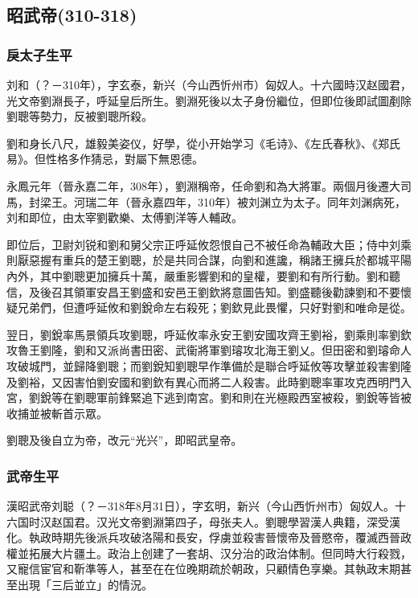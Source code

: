 
\subsection{昭武帝\tiny(310-318)}

\subsubsection{戾太子生平}

刘和（？－310年），字玄泰，新兴（今山西忻州市）匈奴人。十六國時汉赵國君，光文帝劉淵長子，呼延皇后所生。劉淵死後以太子身份繼位，但即位後即試圖剷除劉聰等勢力，反被劉聰所殺。

劉和身长八尺，雄毅美姿仪，好學，從小开始学习《毛诗》、《左氏春秋》、《郑氏易》。但性格多作猜忌，對屬下無恩德。

永鳳元年（晉永嘉二年，308年），劉淵稱帝，任命劉和為大將軍。兩個月後遷大司馬，封梁王。河瑞二年（晉永嘉四年，310年）被刘渊立为太子。同年刘渊病死，刘和即位，由太宰劉歡樂、太傅劉洋等人輔政。

即位后，卫尉刘锐和劉和舅父宗正呼延攸怨恨自己不被任命為輔政大臣；侍中刘乘則厭惡握有重兵的楚王劉聰，於是共同合謀，向劉和進讒，稱諸王擁兵於都城平陽內外，其中劉聰更加擁兵十萬，嚴重影響劉和的皇權，要劉和有所行動。劉和聽信，及後召其領軍安昌王劉盛和安邑王劉欽將意圖告知。劉盛聽後勸諫劉和不要懷疑兄弟們，但遭呼延攸和劉銳命左右殺死；劉欽見此畏懼，只好對劉和唯命是從。

翌日，劉銳率馬景領兵攻劉聰，呼延攸率永安王劉安國攻齊王劉裕，劉乘則率劉欽攻魯王劉隆，劉和又派尚書田密、武衞將軍劉璿攻北海王劉乂。但田密和劉璿命人攻破城門，並歸降劉聰；而劉銳知劉聰早作準備於是聯合呼延攸等攻擊並殺害劉隆及劉裕，又因害怕劉安國和劉欽有異心而將二人殺害。此時劉聰率軍攻克西明門入宮，劉銳等在劉聰軍前鋒緊追下逃到南宮。劉和則在光極殿西室被殺，劉銳等皆被收捕並被斬首示眾。

劉聰及後自立为帝，改元“光兴”，即昭武皇帝。

\subsubsection{武帝生平}

漢昭武帝刘聪（？－318年8月31日），字玄明，新兴（今山西忻州市）匈奴人。十六国时汉赵国君。汉光文帝劉淵第四子，母张夫人。劉聰學習漢人典籍，深受漢化。執政時期先後派兵攻破洛陽和長安，俘虜並殺害晉懷帝及晉愍帝，覆滅西晉政權並拓展大片疆土。政治上创建了一套胡、汉分治的政治体制。但同時大行殺戮，又寵信宦官和靳準等人，甚至在在位晚期疏於朝政，只顧情色享樂。其執政末期甚至出現「三后並立」的情況。

